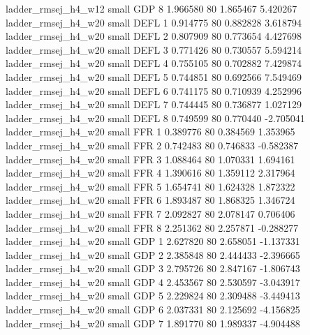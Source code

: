      ladder_rmsej_h4_w12      small      GDP                 8 1.966580 80       1.865467           5.420267
     ladder_rmsej_h4_w20      small     DEFL                 1 0.914775 80       0.882828           3.618794
     ladder_rmsej_h4_w20      small     DEFL                 2 0.807909 80       0.773654           4.427698
     ladder_rmsej_h4_w20      small     DEFL                 3 0.771426 80       0.730557           5.594214
     ladder_rmsej_h4_w20      small     DEFL                 4 0.755105 80       0.702882           7.429874
     ladder_rmsej_h4_w20      small     DEFL                 5 0.744851 80       0.692566           7.549469
     ladder_rmsej_h4_w20      small     DEFL                 6 0.741175 80       0.710939           4.252996
     ladder_rmsej_h4_w20      small     DEFL                 7 0.744445 80       0.736877           1.027129
     ladder_rmsej_h4_w20      small     DEFL                 8 0.749599 80       0.770440          -2.705041
     ladder_rmsej_h4_w20      small      FFR                 1 0.389776 80       0.384569           1.353965
     ladder_rmsej_h4_w20      small      FFR                 2 0.742483 80       0.746833          -0.582387
     ladder_rmsej_h4_w20      small      FFR                 3 1.088464 80       1.070331           1.694161
     ladder_rmsej_h4_w20      small      FFR                 4 1.390616 80       1.359112           2.317964
     ladder_rmsej_h4_w20      small      FFR                 5 1.654741 80       1.624328           1.872322
     ladder_rmsej_h4_w20      small      FFR                 6 1.893487 80       1.868325           1.346724
     ladder_rmsej_h4_w20      small      FFR                 7 2.092827 80       2.078147           0.706406
     ladder_rmsej_h4_w20      small      FFR                 8 2.251362 80       2.257871          -0.288277
     ladder_rmsej_h4_w20      small      GDP                 1 2.627820 80       2.658051          -1.137331
     ladder_rmsej_h4_w20      small      GDP                 2 2.385848 80       2.444433          -2.396665
     ladder_rmsej_h4_w20      small      GDP                 3 2.795726 80       2.847167          -1.806743
     ladder_rmsej_h4_w20      small      GDP                 4 2.453567 80       2.530597          -3.043917
     ladder_rmsej_h4_w20      small      GDP                 5 2.229824 80       2.309488          -3.449413
     ladder_rmsej_h4_w20      small      GDP                 6 2.037331 80       2.125692          -4.156825
     ladder_rmsej_h4_w20      small      GDP                 7 1.891770 80       1.989337          -4.904488
